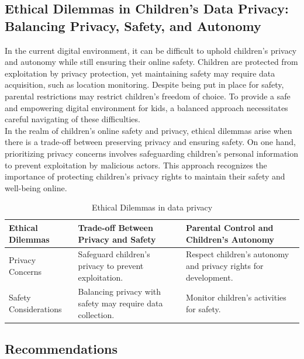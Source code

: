 \documentclass[a4paper, 10 pt, conference]{ieeeconf}  %
\begin{document}
\subsection{Ethical Dilemmas in Children's Data Privacy: Balancing Privacy, Safety, and Autonomy}
In the current digital environment, it can be difficult to uphold children’s privacy and autonomy while still ensuring their online safety. Children are protected from exploitation by privacy protection, yet maintaining safety may require data acquisition, such as location monitoring. Despite being put in place for safety, parental restrictions may restrict children’s freedom of choice. To provide a safe and empowering digital environment for kids, a balanced approach necessitates careful navigating of these difficulties.
\\ In the realm of children's online safety and privacy, ethical dilemmas arise when there is a trade-off between preserving privacy and ensuring safety. On one hand, prioritizing privacy concerns involves safeguarding children's personal information to prevent exploitation by malicious actors. This approach recognizes the importance of protecting children's privacy rights to maintain their safety and well-being online.
\begin{table}[h]
    \centering
    \begin{tabularx}{0.5\textwidth}{|C|C|C|} %
        \hline
       \textbf{Ethical Dilemmas} &	\textbf{Trade-off Between Privacy and Safety} & \textbf{Parental Control and Children's Autonomy} \\
        \hline
       Privacy Concerns& Safeguard children’s privacy to prevent exploitation.&Respect children’s autonomy and privacy rights for development.\\
        \hline
       Safety Considerations &	Balancing privacy with safety may require data collection. &Monitor children’s activities for safety. \\
        \hline
    \end{tabularx}
    \caption{Ethical Dilemmas in data privacy}
    \label{tab:example}
\end{table}

\subsection{Recommendations}
\end{document}
